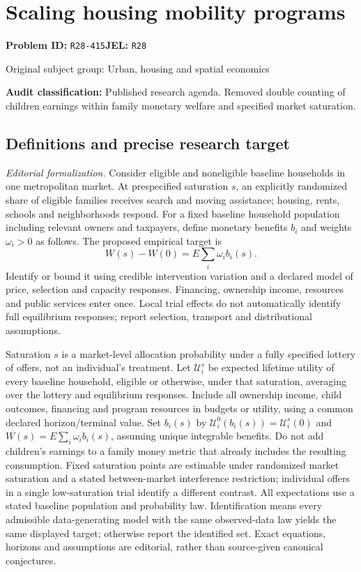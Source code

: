 \documentclass[11pt,a4paper]{article}
\begin{document}
\section*{Scaling housing mobility programs}
\textbf{Problem ID:} \texttt{R28-415}\quad \textbf{JEL:} \texttt{R28}\par
\label{problem:OP-0464}
{\sffamily\small\color{muted}Original subject group: Urban, housing and spatial economics\par}
\label{definitions:problem:30007746}
\textbf{Audit classification:} Published research agenda. Removed double counting of children earnings within family monetary welfare and specified market saturation.
\subsection*{Definitions and precise research target}
\textit{Editorial formalization.} Consider eligible and noneligible baseline households in one metropolitan market. At prespecified saturation \(s\), an explicitly randomized share of eligible families receives search and moving assistance; housing, rents, schools and neighborhoods respond. For a fixed baseline household population including relevant owners and taxpayers, define monetary benefits \(b_i\) and weights \(\omega_i>0\) as follows. The proposed empirical target is \[W(s)-W(0)=E\sum_i\omega_i b_i(s).\] Identify or bound it using credible intervention variation and a declared model of price, selection and capacity responses. Financing, ownership income, resources and public services enter once. Local trial effects do not automatically identify full equilibrium responses; report selection, transport and distributional assumptions.

Saturation \(s\) is a market-level allocation probability under a fully specified lottery of offers, not an individual's treatment. Let \(\mathcal U_i^s\) be expected lifetime utility of every baseline household, eligible or otherwise, under that saturation, averaging over the lottery and equilibrium responses. Include all ownership income, child outcomes, financing and program resources in budgets or utility, using a common declared horizon/terminal value. Set \(b_i(s)\) by \(\mathcal U_i^0(b_i(s))=\mathcal U_i^s(0)\) and \(W(s)=E\sum_i\omega_i b_i(s)\), assuming unique integrable benefits. Do not add children's earnings to a family money metric that already includes the resulting consumption. Fixed saturation points are estimable under randomized market saturation and a stated between-market interference restriction; individual offers in a single low-saturation trial identify a different contrast. All expectations use a stated baseline population and probability law. Identification means every admissible data-generating model with the same observed-data law yields the same displayed target; otherwise report the identified set. Exact equations, horizons and assumptions are editorial, rather than source-given canonical conjectures.
\end{document}
